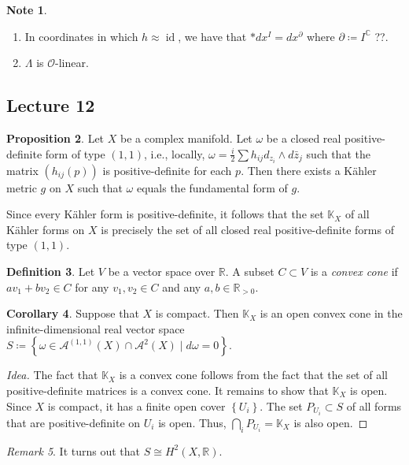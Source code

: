 \documentclass[10pt,letterpaper,cm]{nupset}
\theoremstyle{definition}
\newtheorem{defn}{Definition}[subsection]
\newtheorem{note}[defn]{Note}
\theoremstyle{theorem}
\newtheorem{prop}[defn]{Proposition}
\newtheorem{corollary}[defn]{Corollary}
\theoremstyle{remark}
\newtheorem{remark}[defn]{Remark}
\newcommand{\A}{\mathcal A}
\newcommand{\C}{\mathbb C}
\newcommand{\K}{\mathbb K}
\renewcommand{\O}{\mathcal O}
\newcommand{\R}{\mathbb{R}}
\newcommand{\1}{\mathbb{1}}
\newcommand{\0}{\vec 0}
\DeclareMathOperator{\id}{id}
\newcommand{\be}{\begin{enumerate}}
\newcommand{\ee}{\end{enumerate}}
\begin{document}
\begin{note} $ $
\be
\item In coordinates in which $h\approx \id$, we have that $\ast{d{x^I}} = d{x^{\partial}}$ where $\partial \coloneqq I^{\C}$ ??.
\item $\Lambda$ is $\O$-linear.
\ee
\end{note}

\subsection{Lecture 12}

\begin{prop}
Let $X$ be a complex manifold. Let $\omega$ be a closed real positive-definite form of type $\left(1,1\right)$, i.e., locally, $\omega = \frac{i}{2}\sum h_{ij}d_{z_i}\wedge d{\bar{z}_j}$ such that the matrix $\left(h_{ij}(p)\right)$ is positive-definite for each $p$. Then there exists a K\"ahler metric $g$ on $X$ such that $\omega$ equals the fundamental form of $g$. 
\end{prop}

Since every K\"ahler form is positive-definite, it follows that the set $\K_X$ of all K\"ahler forms on $X$ is precisely the set of all closed real positive-definite forms of type $\left(1,1\right)$.

\begin{defn}
Let $V$ be a vector space over $\R$. A subset $C\subset V$ is a \textit{convex cone} if $av_1 + bv_2 \in C$ for any $v_1, v_2\in C$ and any $a,b\in \R_{>0}$.
\end{defn}

\begin{corollary}
Suppose that $X$ is compact. Then $\K_X$ is an open convex cone in the infinite-dimensional real vector space $S\coloneqq \left\{\omega \in \A^{(1,1)}\left(X\right) \cap \A^2\left(X\right) \mid d{\omega} =0\right\}$.
\end{corollary}
\begin{proof}[Idea]
The fact that $\K_X$ is a convex cone follows from the fact that the set of all positive-definite matrices is a convex cone. It remains to show that $\K_X$ is open. Since $X$ is compact, it has a finite open cover $\left\{U_i\right\}$. The set $P_{U_i}\subset S$ of all  forms that are positive-definite on $U_i$ is open. Thus, $\bigcap_i P_{U_i} = \K_X$  is also open.
\end{proof}

\begin{remark}
It turns out that $S \cong H^2\left(X, \R\right)$.
\end{remark}
\end{document}
